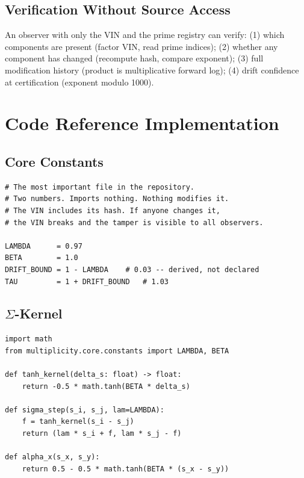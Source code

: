\documentclass[12pt,letterpaper]{article}
\begin{document}
\subsection{Verification Without Source Access}
An observer with only the VIN and the prime registry can verify:
(1) which components are present (factor VIN, read prime indices);
(2) whether any component has changed (recompute hash, compare exponent);
(3) full modification history (product is multiplicative forward log);
(4) drift confidence at certification (exponent modulo 1000).

\section{Code Reference Implementation}\label{sec:code}

\subsection{Core Constants}
\begin{lstlisting}[caption={multiplicity/core/constants.py}]
# The most important file in the repository.
# Two numbers. Imports nothing. Nothing modifies it.
# The VIN includes its hash. If anyone changes it,
# the VIN breaks and the tamper is visible to all observers.

LAMBDA      = 0.97
BETA        = 1.0
DRIFT_BOUND = 1 - LAMBDA    # 0.03 -- derived, not declared
TAU         = 1 + DRIFT_BOUND   # 1.03
\end{lstlisting}

\subsection{$\Sigma$-Kernel}
\begin{lstlisting}[caption={mirror\_dissonance/sigma\_kernel.py}]
import math
from multiplicity.core.constants import LAMBDA, BETA

def tanh_kernel(delta_s: float) -> float:
    return -0.5 * math.tanh(BETA * delta_s)

def sigma_step(s_i, s_j, lam=LAMBDA):
    f = tanh_kernel(s_i - s_j)
    return (lam * s_i + f, lam * s_j - f)

def alpha_x(s_x, s_y):
    return 0.5 - 0.5 * math.tanh(BETA * (s_x - s_y))
\end{lstlisting}
\end{document}
